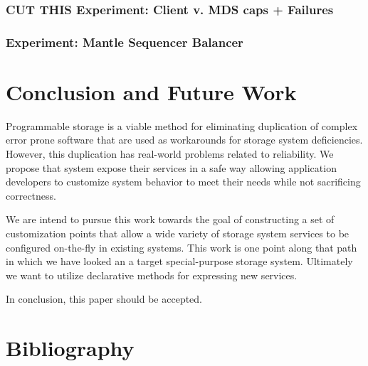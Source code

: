 \documentclass[10pt,twocolumn]{article}
\begin{document}
\subsubsection{CUT THIS Experiment: Client v. MDS caps +
Failures}\label{cut-this-experiment-client-v.-mds-caps-failures}

\subsubsection{Experiment: Mantle Sequencer
Balancer}\label{experiment-mantle-sequencer-balancer}

\section{Conclusion and Future Work}\label{conclusion-and-future-work}

Programmable storage is a viable method for eliminating duplication of
complex error prone software that are used as workarounds for storage
system deficiencies. However, this duplication has real-world problems
related to reliability. We propose that system expose their services in
a safe way allowing application developers to customize system behavior
to meet their needs while not sacrificing correctness.

We are intend to pursue this work towards the goal of constructing a set
of customization points that allow a wide variety of storage system
services to be configured on-the-fly in existing systems. This work is
one point along that path in which we have looked an a target
special-purpose storage system. Ultimately we want to utilize
declarative methods for expressing new services.

In conclusion, this paper should be accepted.

\section{Bibliography}\label{bibliography}
\end{document}
